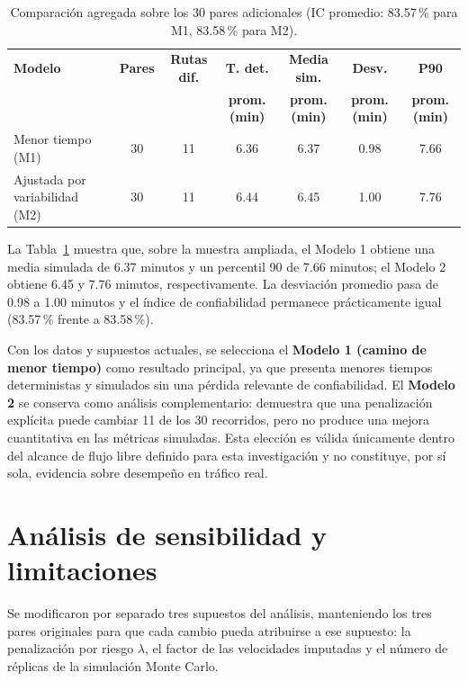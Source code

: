 \documentclass[11pt]{article}
\numberwithin{equation}{section}
\begin{document}
\begin{table}[h!]
\centering
\small
\begin{tabularx}{\textwidth}{>{\raggedright\arraybackslash}X c c c c c c}
\toprule
\textbf{Modelo} & \textbf{Pares} & \textbf{Rutas dif.} & \textbf{T. det.} & \textbf{Media sim.} & \textbf{Desv.} & \textbf{P90} \\
 & & & \textbf{prom. (min)} & \textbf{prom. (min)} & \textbf{prom. (min)} & \textbf{prom. (min)} \\
\midrule
Menor tiempo (M1) & 30 & 11 & 6.36 & 6.37 & 0.98 & 7.66 \\
Ajustada por variabilidad (M2) & 30 & 11 & 6.44 & 6.45 & 1.00 & 7.76 \\
\bottomrule
\end{tabularx}
\caption{Comparación agregada sobre los 30 pares adicionales (IC promedio: 83.57\,\% para M1, 83.58\,\% para M2).}
\label{tab:validacion_adicional}
\end{table}

La Tabla~\ref{tab:validacion_adicional} muestra que, sobre la muestra ampliada, el Modelo 1 obtiene una media simulada de 6.37 minutos y un percentil 90 de 7.66 minutos; el Modelo 2 obtiene 6.45 y 7.76 minutos, respectivamente. La desviación promedio pasa de 0.98 a 1.00 minutos y el índice de confiabilidad permanece prácticamente igual (83.57\,\% frente a 83.58\,\%).

Con los datos y supuestos actuales, se selecciona el \textbf{Modelo 1 (camino de menor tiempo)} como resultado principal, ya que presenta menores tiempos deterministas y simulados sin una pérdida relevante de confiabilidad. El \textbf{Modelo 2} se conserva como análisis complementario: demuestra que una penalización explícita puede cambiar 11 de los 30 recorridos, pero no produce una mejora cuantitativa en las métricas simuladas. Esta elección es válida únicamente dentro del alcance de flujo libre definido para esta investigación y no constituye, por sí sola, evidencia sobre desempeño en tráfico real.

\section{Análisis de sensibilidad y limitaciones}\label{sec:sensibilidad}

Se modificaron por separado tres supuestos del análisis, manteniendo los tres pares originales para que cada cambio pueda atribuirse a ese supuesto: la penalización por riesgo $\lambda$, el factor de las velocidades imputadas y el número de réplicas de la simulación Monte Carlo.
\end{document}
